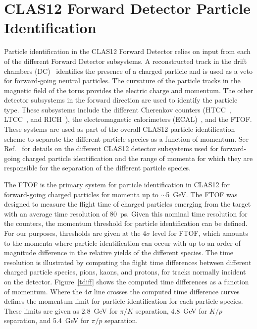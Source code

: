\documentclass[3p,times,twocolumn]{elsarticle}
\begin{document}
\section{CLAS12 Forward Detector Particle Identification}
\label{clas12-fd-pid}

Particle identification in the CLAS12 Forward Detector relies on input from each of the different Forward
Detector subsystems. A reconstructed track in the drift chambers (DC)~\cite{dc-nim} identifies the
presence of a charged particle and is used as a veto for forward-going neutral particles. The curvature
of the particle tracks in the magnetic field of the torus provides the electric charge and momentum.
The other detector subsystems in the forward direction are used to identify the particle type. These
subsystems include the different Cherenkov counters (HTCC~\cite{htcc-nim}, LTCC~\cite{ltcc-nim}, and
RICH~\cite{rich-nim}), the electromagnetic calorimeters (ECAL)~\cite{ec-nim}, and the FTOF. These
systems are used as part of the overall CLAS12 particle identification scheme to separate the different
particle species as a function of momentum. See Ref.~\cite{clas12-nim} for details on the different
CLAS12 detector subsystems used for forward-going charged particle identification and the range of
momenta for which they are responsible for the separation of the different particle species.

The FTOF is the primary system for particle identification in CLAS12 for forward-going charged particles
for momenta up to $\sim$5~GeV. The FTOF  was designed to measure the flight time of charged particles
emerging from the target with an average time resolution of 80~ps. Given this nominal time resolution for the
counters, the momentum threshold for particle identification can be defined. For our purposes, thresholds are
given at the 4$\sigma$ level for FTOF, which amounts to the momenta where particle identification can occur
with up to an order of magnitude difference in the relative yields of the different species. The time resolution
is illustrated by computing the flight time differences between different charged particle species, pions,
kaons, and protons, for tracks normally incident on the detector. Figure~\ref{tdiff} shows the computed time
differences as a function of momentum. Where the 4$\sigma$ line crosses the computed time difference
curves defines the momentum limit for particle identification for each particle species. These limits are given
as 2.8~GeV for $\pi/K$ separation, 4.8~GeV for $K/p$ separation, and 5.4~GeV for $\pi/p$ separation.  
\end{document}
